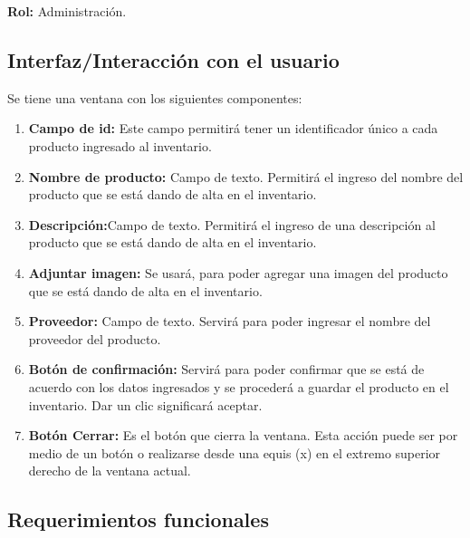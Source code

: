 \documentclass[a4paper,DIV=12]{scrreprt}
\begin{document}
\textbf{Rol:} Administración.

\subsection*{Interfaz/Interacción con el usuario}

Se tiene una ventana con los siguientes componentes: 

\begin{enumerate}
	\item{\textbf{Campo de id:} Este campo permitirá tener un identificador único a cada producto ingresado al inventario. }
	\item{\textbf{Nombre de producto:}  Campo de texto. Permitirá el ingreso del nombre del producto que se está dando de alta en el inventario. }
	\item{\textbf{Descripción:}Campo de texto. Permitirá el ingreso de una descripción al producto que se está dando de alta en el inventario. }
	\item{\textbf{Adjuntar imagen:} Se usará, para poder agregar una imagen del producto que se está dando de alta en el inventario. }
	\item{\textbf{Proveedor:} Campo de texto. Servirá para poder ingresar el nombre del proveedor del producto.}
	\item{\textbf{Botón de confirmación:} Servirá para poder confirmar que se está de acuerdo con los datos ingresados y se procederá a guardar el producto en el inventario. Dar un clic significará aceptar.}
	
	\item{\textbf{Botón Cerrar:} Es el botón que cierra la ventana. Esta acción puede ser por medio de un botón o realizarse desde una equis (x) en el extremo superior derecho de la ventana actual.}

\end{enumerate}
\newpage

\subsection*{Requerimientos funcionales}
\end{document}
